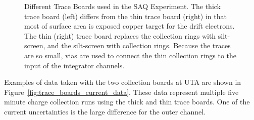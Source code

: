 \begin{figure}[]
\begin{subfigure}{.45\textwidth}
  \caption{}
\end{subfigure}
\caption{Different Trace Boards used in the SAQ Experiment.
The thick trace board (left) differs from the thin trace board (right) in that most of surface area is exposed copper target for the drift electrons.
The thin (right) trace board replaces the collection rings with silt-screen, and the silt-screen with collection rings.
Because the traces are so small, vias are used to connect the thin collection rings to the input of the integrator channels.
}
\label{fig:trace_boards}
\end{figure}

Examples of data taken with the two collection boards at UTA are shown in Figure~\ref{fig:trace_boards_current_data}.
These data represent multiple five minute charge collection runs using the thick and thin trace boards.
One of the current uncertainties is the large difference for the outer channel.


